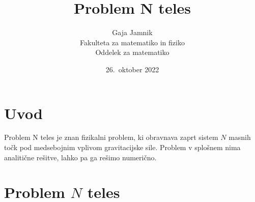 \documentclass[a4paper,12pt]{article}
\title{Problem N teles}
\author{Gaja Jamnik \\
Fakulteta za matematiko in fiziko \\
Oddelek za matematiko}
\date{26.\ oktober 2022}
\begin{document}


\maketitle


\section{Uvod}
Problem N teles je znan fizikalni problem, ki obravnava
zaprt sistem $N$ masnih točk pod medsebojnim vplivom gravitacijske sile.
Problem v splošnem nima analitične rešitve, lahko pa ga rešimo numerično.

\section{Problem $N$ teles}
\end{document}
